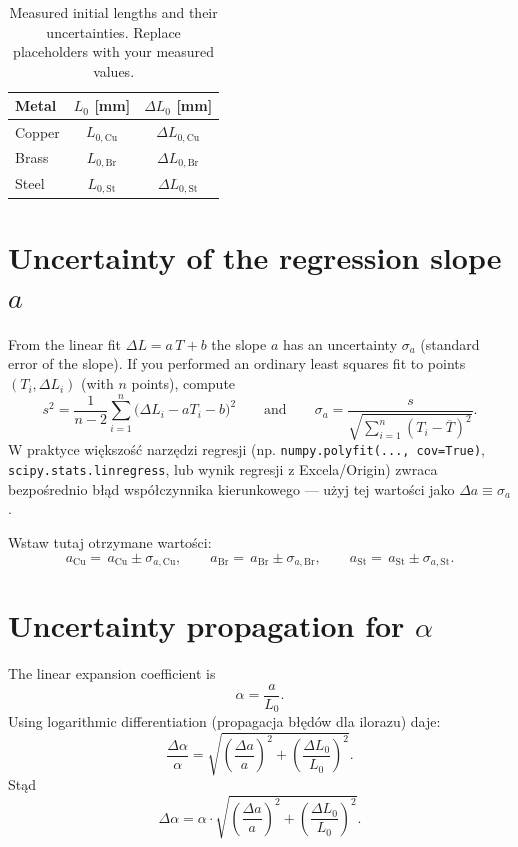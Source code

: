 \documentclass[a4paper,12pt]{article}
\begin{document}
\begin{table}[H]
\centering
\begin{tabular}{l c c}
\toprule
Metal & $L_0$ [mm] & $\Delta L_0$ [mm] \\
\midrule
Copper & \(\,L_{0,\mathrm{Cu}}\,\) & \(\Delta L_{0,\mathrm{Cu}}\) \\
Brass  & \(\,L_{0,\mathrm{Br}}\,\) & \(\Delta L_{0,\mathrm{Br}}\) \\
Steel  & \(\,L_{0,\mathrm{St}}\,\) & \(\Delta L_{0,\mathrm{St}}\) \\
\bottomrule
\end{tabular}
\caption{Measured initial lengths and their uncertainties. Replace placeholders with your measured values.}
\end{table}

\section{Uncertainty of the regression slope \(a\)}

From the linear fit \(\Delta L = a\,T + b\) the slope \(a\) has an uncertainty \(\sigma_a\) (standard error of the slope). If you performed an ordinary least squares fit to points \((T_i,\Delta L_i)\) (with \(n\) points), compute
\[
s^2 = \frac{1}{n-2}\sum_{i=1}^n\big(\Delta L_i - aT_i - b\big)^2
\qquad\text{and}\qquad
\sigma_a = \frac{s}{\sqrt{\sum_{i=1}^n (T_i-\overline{T})^2}} .
\]
W praktyce większość narzędzi regresji (np. \texttt{numpy.polyfit(..., cov=True)}, \texttt{scipy.stats.linregress}, lub wynik regresji z Excela/Origin) zwraca bezpośrednio błąd współczynnika kierunkowego — użyj tej wartości jako \(\Delta a\equiv\sigma_a\).

Wstaw tutaj otrzymane wartości:
\[
a_{\mathrm{Cu}} = \,a_{\mathrm{Cu}} \pm \sigma_{a,\mathrm{Cu}},\qquad
a_{\mathrm{Br}} = \,a_{\mathrm{Br}} \pm \sigma_{a,\mathrm{Br}},\qquad
a_{\mathrm{St}} = \,a_{\mathrm{St}} \pm \sigma_{a,\mathrm{St}}.
\]

\section{Uncertainty propagation for \(\alpha\)}

The linear expansion coefficient is
\[
\alpha = \frac{a}{L_0}.
\]
Using logarithmic differentiation (propagacja błędów dla ilorazu) daje:
\[
\frac{\Delta\alpha}{\alpha}
= \sqrt{\left(\frac{\Delta a}{a}\right)^2 + \left(\frac{\Delta L_0}{L_0}\right)^2 }.
\]
Stąd
\[
\Delta\alpha = \alpha \cdot
\sqrt{\left(\frac{\Delta a}{a}\right)^2 + \left(\frac{\Delta L_0}{L_0}\right)^2 } .
\]
\end{document}
